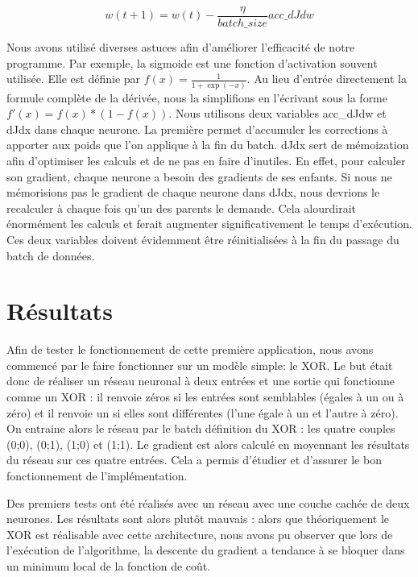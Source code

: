\begin{equation}
w(t+1) = w(t) - \frac{\eta}{batch\_size}acc\_dJdw
\label{mise_a_jour_poids_batch}
\end{equation}

Nous avons utilisé diverses astuces afin d'améliorer l'efficacité de notre programme. Par exemple, la sigmoide est une fonction d'activation souvent utilisée. Elle est définie par $f(x) = \frac{1}{1+\exp(-x)}$. Au lieu d'entrée directement la formule complète de la dérivée, nous la simplifions en l'écrivant sous la forme $f'(x) = f(x) * (1 - f(x))$.
Nous utilisons deux variables acc\_dJdw et dJdx dans chaque neurone. La première permet d'accumuler les corrections à apporter aux poids que l'on applique à la fin du batch. dJdx sert de mémoization afin d'optimiser les calculs et de ne pas en faire d'inutiles. En effet, pour calculer son gradient, chaque neurone a besoin des gradients de ses enfants. Si nous ne mémorisions pas le gradient de chaque neurone dans dJdx, nous devrions le recalculer à chaque fois qu'un des parents le demande. Cela alourdirait énormément les calculs et ferait augmenter significativement le temps d'exécution. Ces deux variables doivent évidemment être réinitialisées à la fin du passage du batch de données.

\section{Résultats}
\label{sec:Résultats}
Afin de tester le fonctionnement de cette première application, nous avons commencé par le faire fonctionner sur un modèle simple: le XOR. Le but était donc de réaliser un réseau neuronal à deux entrées et une sortie qui fonctionne comme un XOR : il renvoie zéros si les entrées sont semblables (égales à un ou à zéro) et il renvoie un si elles sont différentes (l'une égale à un et l'autre à zéro). On entraine alors le réseau par le batch définition du XOR : les quatre couples (0;0), (0;1), (1;0) et (1;1). Le gradient est alors calculé en moyennant les résultats du réseau sur ces quatre entrées.
Cela a permis d'étudier et d'assurer le bon fonctionnement de l'implémentation.

Des premiers tests ont été réalisés avec un réseau avec une couche cachée de deux neurones. Les résultats sont alors plutôt mauvais : alors que théoriquement le XOR est réalisable avec cette architecture, nous avons pu observer que lors de l'exécution de l'algorithme, la descente du gradient a tendance à se bloquer dans un minimum local de la fonction de coût. 

